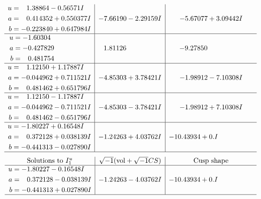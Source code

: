 \documentclass[1p]{elsarticle_modified}
\theoremstyle{definition}
\newcommand{\I}{\sqrt{-1}}
\begin{document}
$$\begin{array}{c|c|c}
\begin{aligned}
u &= \phantom{-}1.38864 - 0.56571 I \\
a &= \phantom{-}0.414352 + 0.550377 I \\
b &= -0.223840 + 0.647984 I\end{aligned}
 & -7.66190 - 2.29159 I & -5.67077 + 3.09442 I \\ \hline\begin{aligned}
u &= -1.60304\phantom{ +0.000000I} \\
a &= -0.427829\phantom{ +0.000000I} \\
b &= \phantom{-}0.481754\phantom{ +0.000000I}\end{aligned}
 & \phantom{-}1.81126\phantom{ +0.000000I} & -9.27850\phantom{ +0.000000I} \\ \hline\begin{aligned}
u &= \phantom{-}1.12150 + 1.17887 I \\
a &= -0.044962 + 0.711521 I \\
b &= \phantom{-}0.481462 + 0.651796 I\end{aligned}
 & -4.85303 + 3.78421 I & -1.98912 - 7.10308 I \\ \hline\begin{aligned}
u &= \phantom{-}1.12150 - 1.17887 I \\
a &= -0.044962 - 0.711521 I \\
b &= \phantom{-}0.481462 - 0.651796 I\end{aligned}
 & -4.85303 - 3.78421 I & -1.98912 + 7.10308 I \\ \hline\begin{aligned}
u &= -1.80227 + 0.16548 I \\
a &= \phantom{-}0.372128 + 0.038139 I \\
b &= -0.441313 - 0.027890 I\end{aligned}
 & -1.24263 + 4.03762 I & -10.43934 + 0. I\phantom{ +0.000000I}\\
 \hline 
 \end{array}$$\newpage$$\begin{array}{c|c|c}  
\text{Solutions to }I^u_{1}& \I (\text{vol} + \sqrt{-1}CS) & \text{Cusp shape}\\
 \hline 
\begin{aligned}
u &= -1.80227 - 0.16548 I \\
a &= \phantom{-}0.372128 - 0.038139 I \\
b &= -0.441313 + 0.027890 I\end{aligned}
 & -1.24263 - 4.03762 I & -10.43934 + 0. I\phantom{ +0.000000I}\\
 \hline 
 \end{array}$$\newpage\newpage\renewcommand{\arraystretch}{1}
\end{document}
